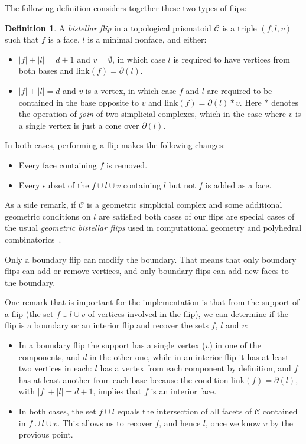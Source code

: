 \documentclass[12pt,a4paper]{article}
\theoremstyle{plain}
\theoremstyle{definition}
\newtheorem{definition}{Definition}
\begin{document}
The following definition considers together these two types of flips:

\begin{definition}
A \emph{bistellar flip} in a topological prismatoid $\mathcal{C}$ is a triple $(f,l,v)$ such that $f$ is a face, $l$ is a minimal nonface, and either:
\begin{itemize}
\item $|f|+|l|=d+1$ and $v=\emptyset$, in which case $l$ is required to have vertices from both bases and $\text{link}(f)=\partial(l)$.
\item $|f|+|l|=d$ and $v$ is a vertex, in which case $f$ and $l$ are required to be contained in the base opposite to $v$ and $\text{link}(f)=\partial(l)*v$. Here $*$ denotes the operation of \emph{join} of two simplicial complexes, which in the case where $v$ is a single vertex is just a cone over $\partial(l)$.
\end{itemize}
In both cases, performing a flip makes the following changes:
  \begin{itemize}
  \item Every face containing $f$ is removed.
  \item Every subset of the $f\cup l \cup v$ containing $l$ but not $f$ is added as a face.
\end{itemize}
\end{definition}

As a side remark, if $\mathcal{C}$ is a geometric simplicial complex and some additional geometric conditions on $l$ are satisfied both cases of our flips are special cases of the usual \emph{geometric bistellar flips} used in computational geometry and polyhedral combinatorics~\cite{SantosFlips}.

Only a boundary flip can modify the boundary. That means that only boundary flips can add or remove vertices, and only boundary flips can add new faces to the boundary. 

One remark that is important for the implementation is that from the support of a flip (the set $f\cup l \cup v$ of vertices involved in the flip), we can determine if the flip is a boundary or an interior flip and recover the sets $f$, $l$ and $v$:

\begin{itemize}
\item In a boundary flip the support has a single vertex ($v$) in one of the components, and $d$ in the other one, while in an interior flip it has at least two vertices in each: $l$ has a vertex from each component by definition, and $f$ has at least another from each base because the condition $\text{link}(f)=\partial(l)$, with $|f|+|l|=d+1$, implies that $f$ is an interior face.

\item In both cases, the set $f\cup l$ equals the intersection of all facets of $\mathcal{C}$ contained in $f\cup l \cup v$. This allows us to recover $f$, and hence $l$, once we know $v$ by the provious point.
\end{itemize}
\end{document}
